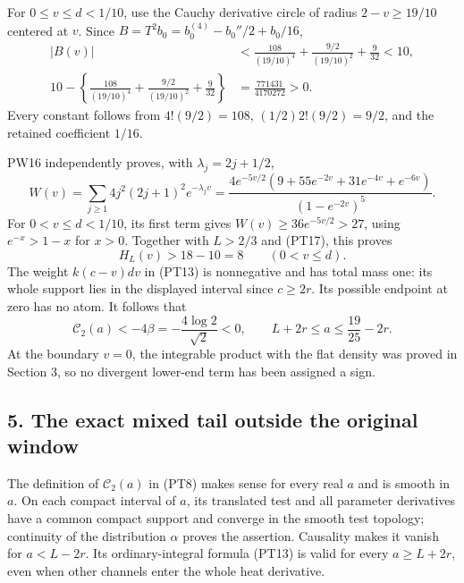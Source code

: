 \documentclass[
  10pt,
  a4paper,
]{article}
\begin{document}
For \(0\le v\le d<1/10\), use the Cauchy derivative circle of radius
\(2-v\ge19/10\) centered at \(v\). Since
\(B=T^2b_0=b_0^{(4)}-b_0''/2+b_0/16\), \[
\begin{aligned}
|B(v)|
&<\frac{108}{(19/10)^4}+\frac{9/2}{(19/10)^2}+\frac9{32}<10,\\
10-\left\{\frac{108}{(19/10)^4}+\frac{9/2}{(19/10)^2}+\frac9{32}\right\}
&=\frac{771431}{4170272}>0.
\end{aligned}
\tag{PT17}
\] Every constant follows from \(4!(9/2)=108\), \((1/2)2!(9/2)=9/2\),
and the retained coefficient \(1/16\).

PW16 independently proves, with \(\lambda_j=2j+1/2\), \[
W(v)=\sum_{j\ge1}4j^2(2j+1)^2e^{-\lambda_jv}
=\frac{4e^{-5v/2}(9+55e^{-2v}+31e^{-4v}+e^{-6v})}{(1-e^{-2v})^5}.
\tag{PT18}
\] For \(0<v\le d<1/10\), its first term gives
\(W(v)\ge36e^{-5v/2}>27\), using \(e^{-x}>1-x\) for \(x>0\). Together
with \(L>2/3\) and (PT17), this proves \[
H_L(v)>18-10=8\qquad(0<v\le d).
\tag{PT19}
\] The weight \(k(c-v)dv\) in (PT13) is nonnegative and has total mass
one: its whole support lies in the displayed interval since \(c\ge2r\).
Its possible endpoint at zero has no atom. It follows that \[
\boxed{\mathcal C_2(a)<-4\beta=-\frac{4\log2}{\sqrt2}<0,
\qquad L+2r\le a\le\frac{19}{25}-2r.}
\tag{PT20}
\] At the boundary \(v=0\), the integrable product with the flat density
was proved in Section 3, so no divergent lower-end term has been
assigned a sign.

\subsection{5. The exact mixed tail outside the original
window}\label{the-exact-mixed-tail-outside-the-original-window}

The definition of \(\mathcal C_2(a)\) in (PT8) makes sense for every
real \(a\) and is smooth in \(a\). On each compact interval of \(a\),
its translated test and all parameter derivatives have a common compact
support and converge in the smooth test topology; continuity of the
distribution \(\alpha\) proves the assertion. Causality makes it vanish
for \(a<L-2r\). Its ordinary-integral formula (PT13) is valid for every
\(a\ge L+2r\), even when other channels enter the whole heat derivative.
\end{document}

